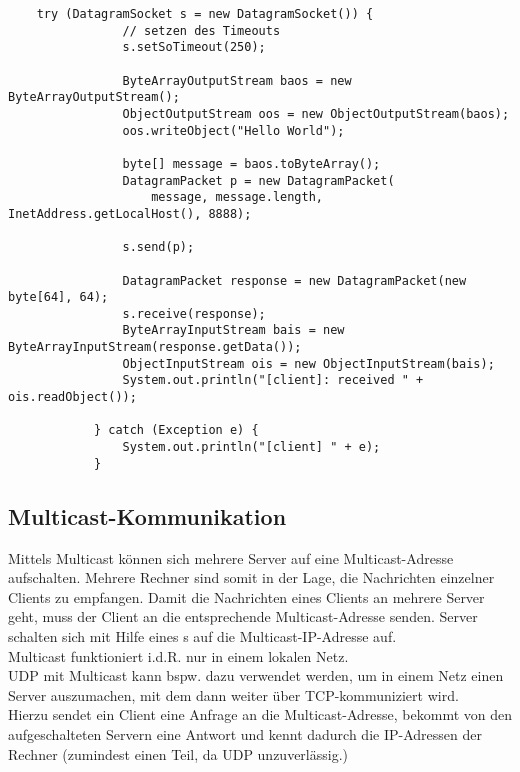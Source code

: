 \begin{verbatim}
    try (DatagramSocket s = new DatagramSocket()) {
                // setzen des Timeouts
                s.setSoTimeout(250);

                ByteArrayOutputStream baos = new ByteArrayOutputStream();
                ObjectOutputStream oos = new ObjectOutputStream(baos);
                oos.writeObject("Hello World");

                byte[] message = baos.toByteArray();
                DatagramPacket p = new DatagramPacket(
                    message, message.length, InetAddress.getLocalHost(), 8888);

                s.send(p);

                DatagramPacket response = new DatagramPacket(new byte[64], 64);
                s.receive(response);
                ByteArrayInputStream bais = new ByteArrayInputStream(response.getData());
                ObjectInputStream ois = new ObjectInputStream(bais);
                System.out.println("[client]: received " + ois.readObject());

            } catch (Exception e) {
                System.out.println("[client] " + e);
            }
\end{verbatim}

\subsection*{Multicast-Kommunikation}

Mittels Multicast können sich mehrere Server auf eine Multicast-Adresse aufschalten.
Mehrere Rechner sind somit in der Lage, die Nachrichten einzelner Clients zu empfangen.
Damit die Nachrichten eines Clients an mehrere Server geht, muss der Client an die entsprechende Multicast-Adresse senden.
Server schalten sich mit Hilfe eines s auf die Multicast-IP-Adresse auf.\\

\noindent
Multicast funktioniert i.d.R. nur in einem lokalen Netz.\\

\noindent
UDP mit Multicast kann bspw. dazu verwendet werden, um in einem Netz einen Server auszumachen, mit dem dann weiter über TCP-kommuniziert wird.\\
Hierzu sendet ein Client eine Anfrage an die Multicast-Adresse, bekommt von den aufgeschalteten Servern eine Antwort und kennt dadurch die IP-Adressen der Rechner (zumindest einen Teil, da UDP unzuverlässig.)\\


